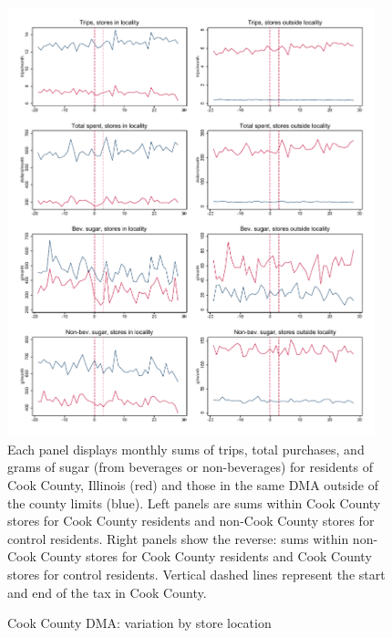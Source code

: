 \documentclass[12pt]{article}
\begin{document}
\clearpage
\begin{figure}[t]
\begin{center}
\caption{Cook County DMA: variation by store location}
\label{cook_panelist_stores}
\includegraphics[width=0.95\textwidth, angle=0]{../figures/panelist_cook_stores.pdf}
\footnotesize Each panel displays monthly sums of trips, total purchases, and grams of sugar (from beverages or non-beverages) for residents of Cook County, Illinois (red) and those in the same DMA outside of the county limits (blue). Left panels are sums within Cook County stores for Cook County residents and non-Cook County stores for control residents. Right panels show the reverse: sums within non-Cook County stores for Cook County residents and Cook County stores for control residents. Vertical dashed lines represent the start and end of the tax in Cook County.
\end{center}
\end{figure}
\end{document}
